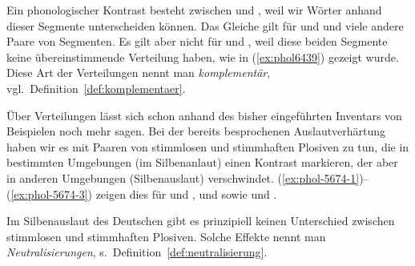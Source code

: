Ein phonologischer Kontrast besteht \zB zwischen \textipa{[t]} und \textipa{[k]}, weil wir Wörter anhand dieser Segmente unterscheiden können.
Das Gleiche gilt für \textipa{[s]} und \textipa{[z]} und viele andere Paare von Segmenten.
Es gilt aber nicht für \textipa{[h]} und \textipa{[N]}, weil diese beiden Segmente keine übereinstimmende Verteilung haben, wie in (\ref{ex:phol6439}) gezeigt wurde.
Diese Art der Verteilungen nennt man \textit{komplementär}, vgl.\ Definition~\ref{def:komplementaer}.


Über Verteilungen lässt sich schon anhand des bisher eingeführten Inventars von Beispielen noch mehr sagen.
Bei der bereits besprochenen Auslautverhärtung haben wir es mit Paaren von stimmlosen und stimmhaften Plosiven zu tun, die in bestimmten Umgebungen (im Silbenanlaut) einen Kontrast markieren, der aber in anderen Umgebungen (Silbenauslaut) verschwindet.
(\ref{ex:phol-5674-1})--(\ref{ex:phol-5674-3}) zeigen dies für \textipa{[g]} und \textipa{[k]}, \textipa{[d]} und \textipa{[t]} sowie \textipa{[b]} und \textipa{[p]}.

\begin{exe}
  \ex\label{ex:phol-5674-1}
  \begin{xlist}
  \end{xlist}
  \ex\label{ex:phol-5674-2}
  \begin{xlist}
  \end{xlist}
  \ex\label{ex:phol-5674-3}
  \begin{xlist}
  \end{xlist}
\end{exe}

Im Silbenauslaut des Deutschen gibt es prinzipiell keinen Unterschied zwischen stimmlosen und stimmhaften Plosiven.
Solche Effekte nennt man \textit{Neutralisierungen}, s.\ Definition~\ref{def:neutralisierung}.

